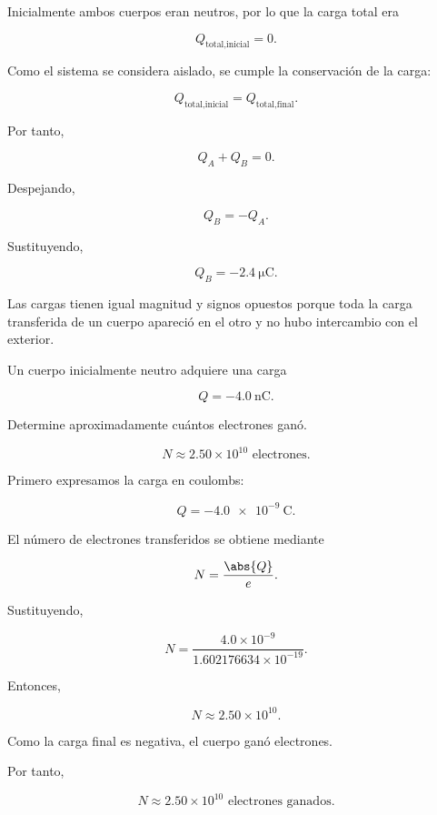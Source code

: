 \begin{explicacion}

Inicialmente ambos cuerpos eran neutros, por lo que la carga total era

\[
Q_{\text{total,inicial}}=0.
\]

Como el sistema se considera aislado, se cumple la conservación de la carga:

\[
Q_{\text{total,inicial}}
=
Q_{\text{total,final}}.
\]

Por tanto,

\[
Q_A+Q_B=0.
\]

Despejando,

\[
Q_B=-Q_A.
\]

Sustituyendo,

\[
\boxed{
Q_B=-\SI{2.4}{\micro\coulomb}
}.
\]

Las cargas tienen igual magnitud y signos opuestos porque toda la carga
transferida de un cuerpo apareció en el otro y no hubo intercambio con el
exterior.

\end{explicacion}



\begin{ejercicio}

Un cuerpo inicialmente neutro adquiere una carga

\[
Q=-\SI{4.0}{\nano\coulomb}.
\]

Determine aproximadamente cuántos electrones ganó.

\end{ejercicio}

\begin{respuesta}

\[
\boxed{
N\approx2.50\times10^{10}\text{ electrones}
}.
\]

\end{respuesta}

\begin{explicacion}

Primero expresamos la carga en coulombs:

\[
Q=-\SI{4.0e-9}{\coulomb}.
\]

El número de electrones transferidos se obtiene mediante

\[
N=\frac{\abs{Q}}{e}.
\]

Sustituyendo,

\[
N=
\frac{4.0\times10^{-9}}
{1.602176634\times10^{-19}}.
\]

Entonces,

\[
N\approx2.50\times10^{10}.
\]

Como la carga final es negativa, el cuerpo ganó electrones.

Por tanto,

\[
\boxed{
N\approx2.50\times10^{10}\text{ electrones ganados}
}.
\]

\end{explicacion}


